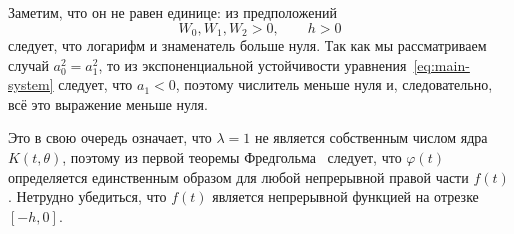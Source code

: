 \documentclass[a4paper,14pt]{article}
\begin{document}
Заметим, что он не равен единице: из предположений
\begin{equation*}
  W_0, W_1, W_2 > 0, \qquad h > 0
\end{equation*}
следует, что логарифм и знаменатель больше нуля. Так как мы рассматриваем
случай $a_0^2 = a_1^2$, то из экспоненциальной устойчивости уравнения~\eqref{eq:main-system}
следует, что $a_1 < 0$, поэтому числитель меньше нуля и, следовательно, всё это
выражение меньше нуля.

Это в свою очередь означает, что $\lambda = 1$ не является собственным числом
ядра $K(t, \theta)$, поэтому из первой теоремы Фредгольма~\cite[стр.~191]{bicadze1982}
следует, что $\varphi(t)$ определяется единственным образом для любой непрерывной
правой части $f(t)$. Нетрудно убедиться, что $f(t)$ является непрерывной функцией
на отрезке $[-h, 0]$.
\end{document}
